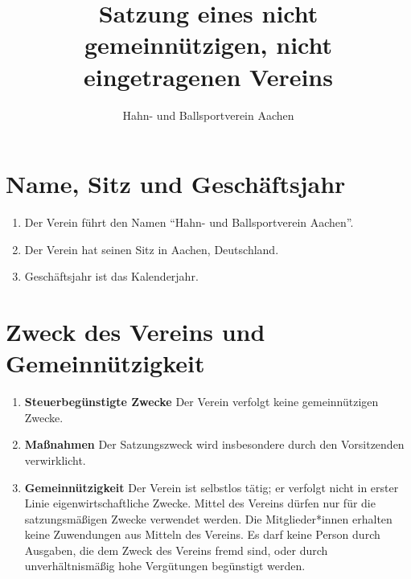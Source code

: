 \documentclass{scrartcl}
\title{Satzung eines nicht gemeinnützigen, nicht eingetragenen Vereins}
\author{Hahn- und Ballsportverein Aachen}
\begin{document}
    \maketitle
    \section{Name, Sitz und Geschäftsjahr}
        \begin{enumerate}
            \item Der Verein führt den Namen ``Hahn- und Ballsportverein Aachen''.
            \item Der Verein hat seinen Sitz in Aachen, Deutschland.
            \item Geschäftsjahr ist das Kalenderjahr.
        \end{enumerate}
    \section{Zweck des Vereins und Gemeinnützigkeit}
        \begin{enumerate}
            \item \textbf{Steuerbegünstigte Zwecke} \newline
                Der Verein verfolgt keine gemeinnützigen Zwecke.
            \item \textbf{Maßnahmen} \newline
                Der Satzungszweck wird insbesondere durch den Vorsitzenden verwirklicht.
            \item \textbf{Gemeinnützigkeit} \newline
                Der Verein ist selbstlos tätig; er verfolgt nicht in erster Linie eigenwirtschaftliche Zwecke. Mittel
                des Vereins dürfen nur für die satzungsmäßigen Zwecke verwendet werden. Die
                Mitglieder*innen erhalten keine Zuwendungen aus Mitteln des Vereins. Es darf keine Person
                durch Ausgaben, die dem Zweck des Vereins fremd sind, oder durch unverhältnismäßig hohe
                Vergütungen begünstigt werden.
        \end{enumerate}
\end{document}
